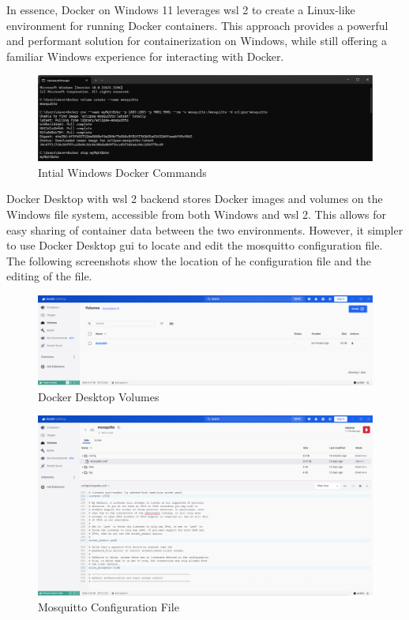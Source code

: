 In essence, Docker on Windows 11 leverages \gls{wsl 2} to create a Linux-like environment for running Docker containers. This approach provides a powerful and performant solution for containerization on Windows, while still offering a familiar Windows experience for interacting with Docker.
\begin{figure}[H]
    \centering
    \includegraphics[scale=0.4]{win1.png}
    \caption{Intial Windows Docker Commands}
    \label{fig:init-docker-cmds}
\end{figure}
Docker Desktop with \gls{wsl 2} backend stores Docker images and volumes on the Windows file system, accessible from both Windows and \gls{wsl 2}. This allows for easy sharing of container data between the two environments. However, it simpler to use Docker Desktop \gls{gui} to locate and edit the mosquitto configuration file. The following screenshots show the location of he configuration file and the editing of the file.
\begin{figure}[H]
    \centering
    \includegraphics[scale=0.33]{volumes.png}
    \caption{Docker Desktop Volumes}
    \label{fig:mosquitto-volume}
\end{figure}
\begin{figure}[H]
    \centering
    \includegraphics[scale=0.33]{edit-config.png}
    \caption{Mosquitto Configuration File}
    \label{fig:mosquitto-config}
\end{figure}
